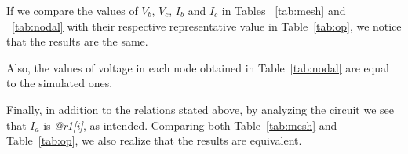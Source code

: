 If we compare the values of $V_b$, $V_c$, $I_b$ and $I_c$ in Tables ~\ref{tab:mesh} and ~\ref{tab:nodal} with their respective representative value in Table~\ref{tab:op}, we notice that the results are the same. 

Also, the values of voltage in each node obtained in Table~\ref{tab:nodal} are equal to the simulated ones.

Finally, in addition to the relations stated above, by analyzing the circuit we see that $I_a$ is \textit{@r1[i]}, as intended. Comparing both Table~\ref{tab:mesh} and Table~\ref{tab:op}, we also realize that the results are equivalent.







